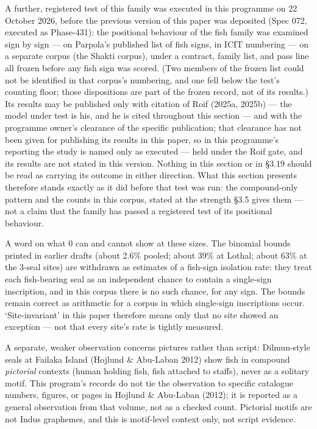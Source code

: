 \documentclass[
]{article}
\begin{document}
A further, registered test of this family was executed in this
programme on 22 October 2026, before the previous version of this
paper was deposited (Spec 072, executed as Phase-431): the
positional behaviour of the fish family was examined sign by sign
--- on Parpola's published list of fish signs, in ICIT numbering
--- on a separate corpus (the Shakti corpus), under a contract,
family list, and pass line all frozen before any fish sign was
scored. (Two members of the frozen list could not be identified in
that corpus's numbering, and one fell below the test's counting
floor; those dispositions are part of the frozen record, not of
its results.) Its results may be published only with citation of
Roif (2025a, 2025b) --- the model under test is his, and he is
cited throughout this section --- and with the programme owner's
clearance of the specific publication; that clearance has not been
given for publishing its results in this paper, so in this
programme's reporting the study is named only as executed --- held
under the Roif gate, and its results are not stated in this
version. Nothing in this section or in §3.19 should be read as
carrying its outcome in either direction. What this section
presents therefore stands exactly as it did before that test was
run: the compound-only pattern and the counts in this corpus,
stated at the strength §3.5 gives them --- not a claim that the
family has passed a registered test of its positional behaviour.

A word on what 0 can and cannot show at these sizes. The binomial bounds printed in earlier drafts (about 2.6\% pooled; about 39\% at Lothal; about 63\% at the 3-seal sites) are withdrawn as estimates of a fish-sign isolation rate: they treat each fish-bearing seal as an independent chance to contain a single-sign inscription, and in this corpus there is no such chance, for any sign. The bounds remain correct as arithmetic for a corpus in which single-sign inscriptions occur. `Site-invariant' in this paper therefore means only that no site showed an exception --- not that every site's rate is tightly measured.

A separate, weaker observation concerns pictures rather than script: Dilmun-style seals at Failaka Island (Hojlund \& Abu-Laban 2012) show fish in compound \emph{pictorial} contexts (human holding fish, fish attached to staffs), never as a solitary motif. This program's records do not tie the observation to specific catalogue numbers, figures, or pages in Hojlund \& Abu-Laban (2012); it is reported as a general observation from that volume, not as a checked count. Pictorial motifs are not Indus graphemes, and this is motif-level context only, not script evidence.
\end{document}

